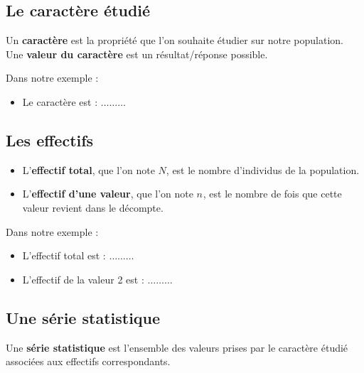 \documentclass[a4paper]{book}
\begin{document}
\subsection{Le caractère étudié}
    \begin{definition}
        Un \textbf{caractère} est la propriété que l'on souhaite étudier sur notre population.\\
        Une \textbf{valeur du caractère} est un résultat/réponse possible.
    \end{definition}

    \medskip    
    Dans notre exemple :
    \begin{itemize}
        \item Le caractère est : $\ldots\ldots\ldots$
    \end{itemize}
    
\subsection{Les effectifs}
    \begin{definition}
        \begin{itemize}
            \item L'\textbf{effectif total}, que l'on note $N$, est le nombre d'individus de la population.
            \item L'\textbf{effectif d'une valeur}, que l'on note $n_{ }$, est le nombre de fois que cette valeur revient dans le décompte.
        \end{itemize}        
    \end{definition}

    \medskip    
    Dans notre exemple :
    \begin{itemize}
        \item L'effectif total est : $\ldots\ldots\ldots$
        \item L'effectif de la valeur 2 est : $\ldots\ldots\ldots$
    \end{itemize}

\newpage


\subsection{Une série statistique}
    \begin{definition}
        Une \textbf{série statistique} est l’ensemble des valeurs prises par le caractère étudié associées aux effectifs correspondants.
    \end{definition}
\end{document}
